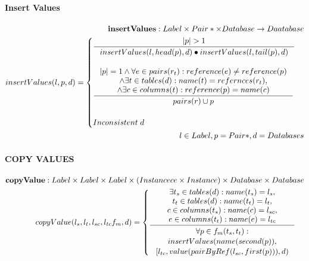 \documentclass[11pt]{article}
\begin{document}
\paragraph{Insert Values}
\begin{align*}
	\mathbf{insertValues} : Label \times Pair* \times Database \rightarrow Daatabase \\
	insertValues(l, p, d) = \begin{cases}
 		\inference{|p| > 1}{insertValues(l, head(p), d)\bullet insertValues(l, tail(p), d)}  \\ \\
 		\inference{|p| = 1 \wedge \forall e \in pairs(r_t) : reference(e) \neq reference(p) \\ \wedge \exists t \in tables(d) : name(t) = refernces(r_t), \\ \wedge \exists c \in columns(t) : reference(p) = name(c)}{pairs(r) \cup p} \\ \\
	 	 Inconsistent \; d
 		\end{cases} \\
l \in Label, p = Pair*, d = Databases
\end{align*}
\paragraph{COPY VALUES}
\begin{align*}
	\mathbf{copyValue} : Label \times Label \times Label \times (Instancece \times Instance) \times Database \times Database \\
	copyValue(l_s, l_t, l_{sc}, l_{tc} f_m, d) = \begin{cases}
 		\inference{\exists t_s \in tables(d) : name(t_s) = l_s, \\ t_t \in tables(d) : name(t_t) = l_t, \\ c \in columns(t_s) : name(c) = l_{sc}, \\ e \in columns(t_t) : name(e) = l_{tc} }{\begin{gathered}
			\forall p \in f_m(t_s, t_t)  : \\ insertValues(name(second(p)), \\ [l_{tc},value(pairByRef(l_{sc}, first(p))),d)
		\end{gathered}}
 	\end{cases}
\end{align*}
\end{document}
